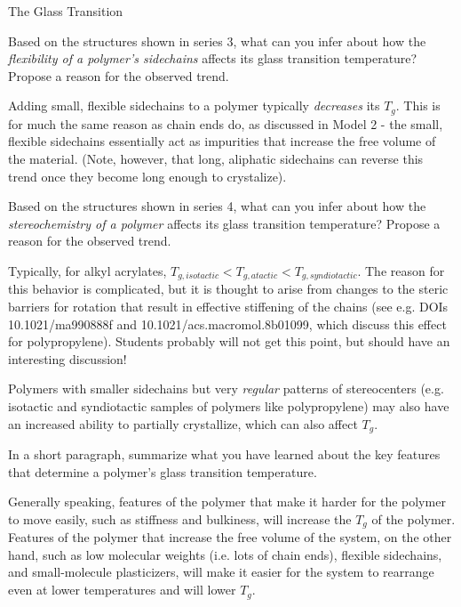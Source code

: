 \begin{activity}{The Glass Transition}
\begin{ctqs}
	\question Based on the structures shown in series 3, what can you infer about how the \emph{flexibility of a polymer's sidechains} affects its glass transition temperature?  Propose a reason for the observed trend.
	
		\begin{solution}[1in]{}
			Adding small, flexible sidechains to a polymer typically \emph{decreases} its $T_g$.  This is for much the same reason as chain ends do, as discussed in Model 2 - the small, flexible sidechains essentially act as impurities that increase the free volume of the material.  (Note, however, that long, aliphatic sidechains can reverse this trend once they become long enough to crystalize).
		\end{solution}
		
	\question Based on the structures shown in series 4, what can you infer about how the \emph{stereochemistry of a polymer} affects its glass transition temperature?  Propose a reason for the observed trend.
	
		\begin{solution}[1in]{}
			Typically, for alkyl acrylates, $T_{g,isotactic}<T_{g,atactic}<T_{g,syndiotactic}$.  The reason for this behavior is complicated, but it is thought to arise from changes to the steric barriers for rotation that result in effective stiffening of the chains (see e.g. DOIs 10.1021/ma990888f and 10.1021/acs.macromol.8b01099, which discuss this effect for polypropylene).  Students probably will not get this point, but should have an interesting discussion!
			
			Polymers with smaller sidechains but very \emph{regular} patterns of stereocenters (e.g. isotactic and syndiotactic samples of polymers like polypropylene) may also have an increased ability to partially crystallize, which can also affect $T_g$.
		\end{solution}
	
	\question In a short paragraph, summarize what you have learned about the key features that determine a polymer's glass transition temperature.
	
		\begin{solution}[2in]{}
			Generally speaking, features of the polymer that make it harder for the polymer to move easily, such as stiffness and bulkiness, will increase the $T_g$ of the polymer.  Features of the polymer that increase the free volume of the system, on the other hand, such as low molecular weights (i.e. lots of chain ends), flexible sidechains, and small-molecule plasticizers, will make it easier for the system to rearrange even at lower temperatures and will lower $T_g$.
		\end{solution}
	

\end{ctqs}
\end{activity}

